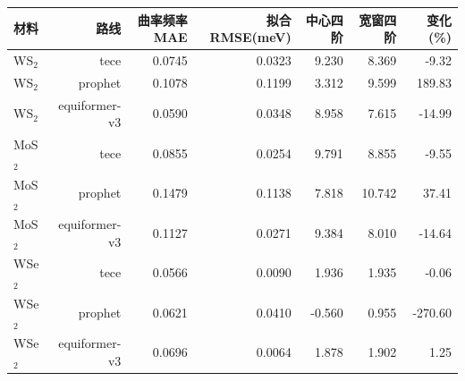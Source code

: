 \begin{tabular}{lrrrrrr}
\toprule
材料 & 路线 & 曲率频率MAE & 拟合RMSE(meV) & 中心四阶 & 宽窗四阶 & 变化(\%) \\
\midrule
WS$_2$ & tece & 0.0745 & 0.0323 & 9.230 & 8.369 & -9.32 \\
WS$_2$ & prophet & 0.1078 & 0.1199 & 3.312 & 9.599 & 189.83 \\
WS$_2$ & equiformer-v3 & 0.0590 & 0.0348 & 8.958 & 7.615 & -14.99 \\
MoS$_2$ & tece & 0.0855 & 0.0254 & 9.791 & 8.855 & -9.55 \\
MoS$_2$ & prophet & 0.1479 & 0.1138 & 7.818 & 10.742 & 37.41 \\
MoS$_2$ & equiformer-v3 & 0.1127 & 0.0271 & 9.384 & 8.010 & -14.64 \\
WSe$_2$ & tece & 0.0566 & 0.0090 & 1.936 & 1.935 & -0.06 \\
WSe$_2$ & prophet & 0.0621 & 0.0410 & -0.560 & 0.955 & -270.60 \\
WSe$_2$ & equiformer-v3 & 0.0696 & 0.0064 & 1.878 & 1.902 & 1.25 \\
\bottomrule
\end{tabular}
